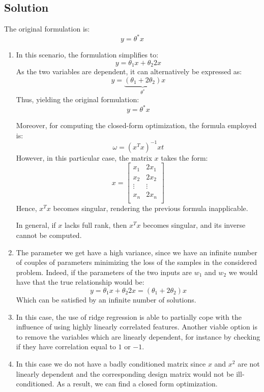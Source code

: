 \subsection*{Solution}
The original formulation is: 
\[y=\theta^\ast x\]
\begin{enumerate}
    \item In this scenario, the formulation simplifies to:
        \[y=\theta_1x+\theta_2 2x\]
        As the two variables are dependent, it can alternatively be expressed as:
        \[y=\underbrace{\left(\theta_1+2\theta_2\right)}_{\theta^\ast} x\]
        Thus, yielding the original formulation:
        \[y=\theta^\ast x\]

        Moreover, for computing the closed-form optimization, the formula employed is:
        \[\omega={\left(x^T x\right)}^{-1}xt\]
        However, in this particular case, the matrix $x$ takes the form:
        \[x=\begin{bmatrix}
            x_1 & 2x_1 \\
            x_2 & 2x_2 \\
            \vdots & \vdots \\
            x_n & 2x_n \\
        \end{bmatrix}\]
        Hence, $x^T x$ becomes singular, rendering the previous formula inapplicable.

        In general, if $x$ lacks full rank, then $x^T x$ becomes singular, and its inverse cannot be computed.
    \item The parameter we get have a high variance, since we have an infinite number of couples of parameters minimizing the loss of the samples in the considered problem. 
        Indeed, if the parameters of the two inputs are $w_1$ and $w_2$ we would have that the true relationship would be:
        \[y=\theta_1x+\theta_2 2x=\left(\theta_1+2\theta_2\right)x\]
        Which can be satisfied by an infinite number of solutions.
    \item In this case, the use of ridge regression is able to partially cope with the influence of using highly linearly correlated features. 
        Another viable option is to remove the variables which are linearly dependent, for instance by checking if they have correlation equal to $1$ or $-1$. 
    \item In this case we do not have a badly conditioned matrix since $x$ and $x^2$ are not linearly dependent and the corresponding design matrix would not be ill-conditioned.
        As a result, we can find a closed form optimization. 
\end{enumerate}